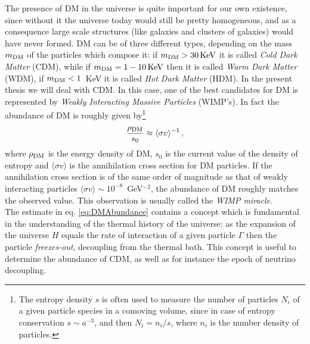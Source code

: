 \documentclass[12pt,a4paper]{book}
\begin{document}
The presence of DM in the universe is quite important for our own existence, since without it the universe today would still be pretty homogeneous, and as a consequence large scale structures (like galaxies and clusters of galaxies) would have never formed. DM can be of three different types, depending on the mass $m_{\rm DM}$ of the particles which compose it: if $m_{\rm DM} > 30 \, \text{KeV}$ it is called \textit{Cold Dark Matter} (CDM), while if $m_{\rm DM} = 1-10 \, \text{KeV}$ then it is called \textit{Warm Dark Matter} (WDM), if $m_{\rm DM} < 1 \,$ KeV it is called \textit{Hot Dark Matter} (HDM). In the present thesis we will deal with CDM. In this case, one of the best candidates for DM is represented by \textit{Weakly Interacting Massive Particles} (WIMP's). In fact the abundance of DM is roughly given by\footnote{The entropy density $s$ is often used to measure the number of particles $N_i$ of a given particle species in a comoving volume, since in case of entropy conservation $s \sim a^{-3}$, and then $N_i = n_i/s$, where $n_i$ is the number density of particles.}
\begin{align}
\label{eq:DMAbundance}
\frac{\rho_{\rm DM}}{s_0} \approx \langle \sigma v \rangle^{-1} \,,
\end{align}
where $\rho_{\rm DM}$ is the energy density of DM, $s_0$ is the current value of the density of entropy and $\langle \sigma v \rangle$ is the annihilation cross section for DM particles. If the annihilation cross section is of the same order of magnitude as that of weakly interacting particles $\langle \sigma v \rangle \sim 10^{-8} \,$ GeV$^{-2}$, the abundance of DM roughly matches the observed value. This observation is usually called the \textit{WIMP miracle}.\\

The estimate in eq. \eqref{eq:DMAbundance} contains a concept which is fundamental in the understanding of the thermal history of the universe: as the expansion of the universe $H$ equals the rate of interaction of a given particle $\Gamma$ then the particle \textit{freezes-out}, decoupling from the thermal bath. This concept is useful to determine the abundance of CDM, as well as for instance the epoch of neutrino decoupling.\\
\end{document}
